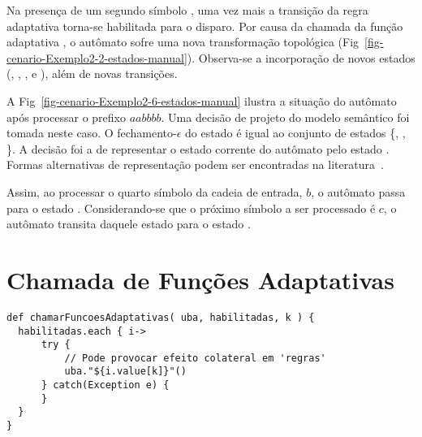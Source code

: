 
Na presença de um segundo símbolo , uma vez mais a transição da regra adaptativa  torna-se habilitada para o disparo. Por causa da chamada da função adaptativa , o autômato  sofre uma nova transformação topológica (Fig~\ref{fig-cenario-Exemplo2-2-estados-manual}). Observa-se a incorporação de novos estados (, , ,  e ), além de novas transições.


A Fig~\ref{fig-cenario-Exemplo2-6-estados-manual} ilustra a situação do autômato após processar o prefixo $aabbbb$. Uma decisão de projeto do modelo semântico foi tomada neste caso. O fechamento-$\epsilon$ do estado  é igual ao conjunto de estados \{, , \}. A decisão foi a de representar o estado corrente do autômato pelo estado . Formas alternativas de representação podem ser encontradas na literatura~\cite{ramos:2009:lftmi}.


Assim, ao processar o quarto símbolo da cadeia de entrada, $b$, o autômato  passa para o estado . Considerando-se que o próximo símbolo a ser processado é $c$, o autômato transita daquele estado para o estado .


\section{Chamada de Funções Adaptativas}
\label{sec:isv:execucao-cfa}

\begin{lstlisting}
def chamarFuncoesAdaptativas( uba, habilitadas, k ) {
  habilitadas.each { i->
      try {
          // Pode provocar efeito colateral em 'regras'
          uba."${i.value[k]}"()
      } catch(Exception e) {
      }
  }
}
\end{lstlisting}

